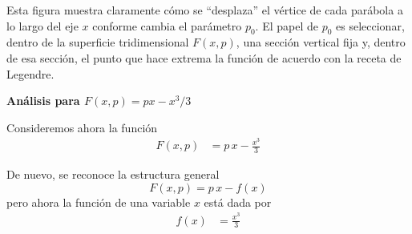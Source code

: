 \documentclass{article}
\begin{document}
\begin{center}
\end{center}



Esta figura muestra claramente cómo se “desplaza” el vértice de cada parábola a lo
largo del eje \(x\) conforme cambia el parámetro \(p_{0}\). El papel de \(p_{0}\) es
seleccionar, dentro de la superficie tridimensional \(F(x,p)\), una sección vertical
fija y, dentro de esa sección, el punto que hace extrema la función de acuerdo con la
receta de Legendre.


\vspace{0.6cm}
\textbf{Análisis para $F(x,p) = px - x^{3}/3$}

Consideremos ahora la función
\begin{equation}
\begin{split}
F(x,p) &= p\,x - \frac{x^{3}}{3}
\end{split}\label{eq:F-cubica}
\end{equation}

De nuevo, se reconoce la estructura general
\[
F(x,p) = p\,x - f(x)
\]
pero ahora la función de una variable \(x\) está dada por
\begin{equation}
\begin{split}
f(x) &= \frac{x^{3}}{3}
\end{split}\label{eq:f-cubica}
\end{equation}
\end{document}
